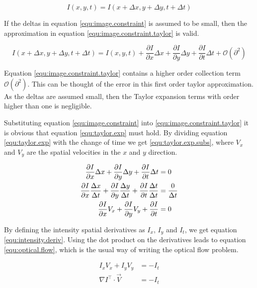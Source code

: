 \begin{equation}
I(x,y,t) = I(x + \Delta x, y+ \Delta y, t + \Delta t)
\label{equ:image.constraint}
\end{equation}

If the deltas in equation \eqref{equ:image.constraint} is assumed to be small, then the approximation in equation \eqref{equ:image.constraint.taylor} is valid.

\begin{equation}
I(x + \Delta x, y+ \Delta y, t + \Delta t) = I(x,y,t) + \frac{\partial I}{\partial x} \Delta x + \frac{\partial I}{\partial y} \Delta y + \frac{\partial I}{\partial t} \Delta t + \mathcal{O}(\partial^2)
\label{equ:image.constraint.taylor}
\end{equation}

Equation \eqref{equ:image.constraint.taylor} contains a higher order collection term $\mathcal{O}(\partial^2)$. This can be thought of the error in this first order taylor approximation. As
the deltas are assumed small, then the Taylor expansion terms with order higher than one is negligible. 

Substituting equation \eqref{equ:image.constraint} into \eqref{equ:image.constraint.taylor} it is obvious that equation \eqref{equ:taylor.exp} must hold. 
By dividing equation \eqref{equ:taylor.exp} with the change of time we get \eqref{equ:taylor.exp.subs}, where $V_x$ and $V_y$ are the spatial velocities in the 
$x$ and $y$ direction.

\begin{align}
\frac{\partial I}{\partial x} \Delta x + \frac{\partial I}{\partial y} \Delta y + \frac{\partial I}{\partial t} \Delta t &= 0 \label{equ:taylor.exp} \\
\frac{\partial I}{\partial x} \frac{\Delta x}{\Delta t} + \frac{\partial I}{\partial y} \frac{\Delta y}{\Delta t} + \frac{\partial I}{\partial t} \frac{\Delta t}{\Delta t} &= \frac{0}{\Delta t} \notag \\
\frac{\partial I}{\partial x} V_x + \frac{\partial I}{\partial y} V_y + \frac{\partial I}{\partial t}  &= 0 \label{equ:taylor.exp.subs}
\end{align}

By defining the intensity spatial derivatives as $I_x$, $I_y$ and $I_t$, we get equation \eqref{equ:intensity.deriv}. Using the dot product on the derivatives 
leads to equation \eqref{equ:optical.flow}, which is the usual way of writing the optical flow problem.

\begin{align}
I_x V_x + I_y V_y &= -I_t \label{equ:intensity.deriv} \\
\nabla I^\top \cdot \vec{V} &= -I_t \label{equ:optical.flow}
\end{align}

